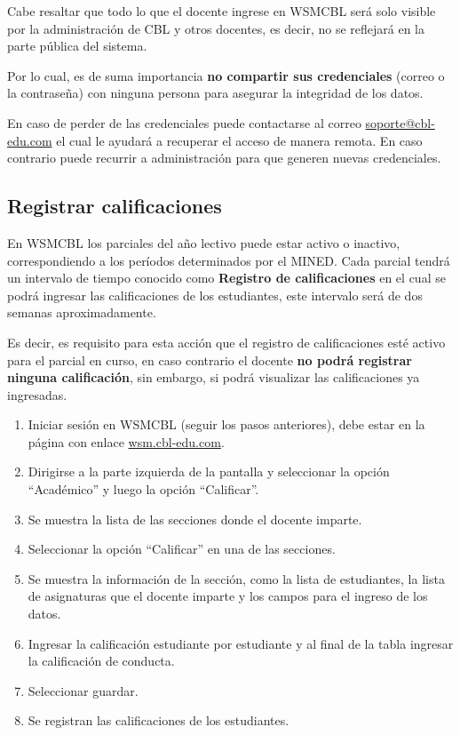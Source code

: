 \documentclass[12pt]{article}
\begin{document}
    Cabe resaltar que todo lo que el docente ingrese en WSMCBL será solo visible por la administración de CBL y otros docentes,
    es decir, no se reflejará en la parte pública del sistema.

    Por lo cual, es de suma importancia \textbf{no compartir sus credenciales} (correo o la contraseña) con ninguna persona para asegurar la integridad de los datos.

    En caso de perder de las credenciales puede contactarse al correo
    \href{mailto:soporte@cbl-edu.com}{soporte@cbl-edu.com}
    el cual le ayudará a recuperar el acceso de manera remota.
    En caso contrario puede recurrir a administración para que generen nuevas credenciales.


    \subsection{Registrar calificaciones}

    En WSMCBL los parciales del año lectivo puede estar activo o inactivo, correspondiendo a los períodos determinados por el MINED.
    Cada parcial tendrá un intervalo de tiempo conocido como \textbf{Registro de calificaciones} en el cual se podrá
    ingresar las calificaciones de los estudiantes, este intervalo será de dos semanas aproximadamente.

    Es decir, es requisito para esta acción que el registro de calificaciones esté activo para el parcial en curso,
    en caso contrario el docente \textbf{no podrá registrar ninguna calificación}, sin embargo, si podrá visualizar las calificaciones ya ingresadas.

    \begin{enumerate}
        \item Iniciar sesión en WSMCBL (seguir los pasos anteriores), debe estar en la página con enlace \href{wsm.cbl-edu.com}{wsm.cbl-edu.com}.
        \item Dirigirse a la parte izquierda de la pantalla y seleccionar la opción ``Académico'' y luego la opción ``Calificar''.
        \item Se muestra la lista de las secciones donde el docente imparte.
        \item Seleccionar la opción ``Calificar'' en una de las secciones.
        \item Se muestra la información de la sección, como la lista de estudiantes, la lista de asignaturas que el docente imparte y los campos para el ingreso de los datos.
        \item Ingresar la calificación estudiante por estudiante y al final de la tabla ingresar la calificación de conducta.
        \item Seleccionar guardar.
        \item Se registran las calificaciones de los estudiantes.
    \end{enumerate}
\end{document}
